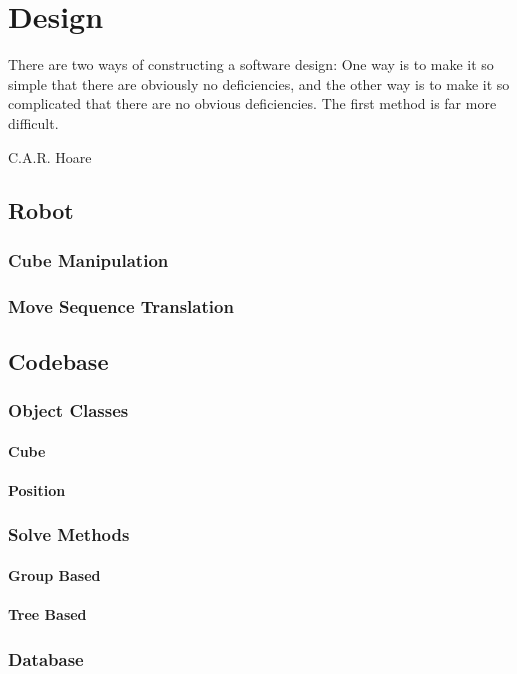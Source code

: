 \documentclass{report}
\begin{document}
    \newpage
    \chapter{Design}
    \epigraph{There are two ways of constructing a software design: One way is to make it so simple that there are obviously no deficiencies, and the other way is to make it so complicated that there are no obvious deficiencies. The first method is far more difficult.}{C.A.R. Hoare\cite{Hoare1981}}
    \section{Robot}
    \subsection{Cube Manipulation}
    \subsection{Move Sequence Translation}
    \section{Codebase}
    \subsection{Object Classes}
    \subsubsection{Cube}
    \subsubsection{Position}
    \subsection{Solve Methods}
    \subsubsection{Group Based}
    \subsubsection{Tree Based}
    \subsection{Database}
    
\end{document}
